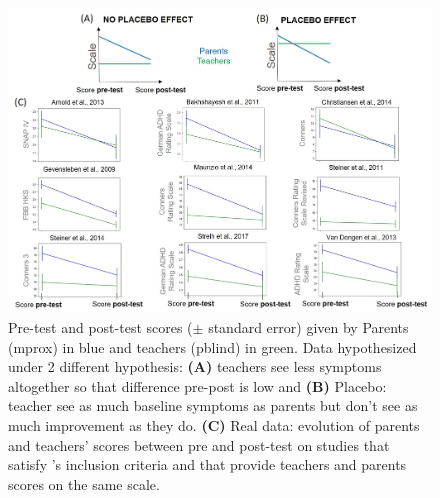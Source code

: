 \begin{figure}[h!]
  \centering
  \includegraphics[width=1.0\linewidth]{figures/discussion_on_placebo_effect_colors_2-columns_fitting_image.jpg}
  \caption{Pre-test and post-test scores ($\pm$ standard error) given by Parents (\gls{mprox}) in blue and teachers (\gls{pblind}) in green. 
	Data hypothesized under 2 different hypothesis: \textbf{(A)} teachers see less symptoms altogether so that difference pre-post is low and \textbf{(B)}
	Placebo: teacher see as much baseline symptoms as parents but don't see as much improvement as they do. \textbf{(C)} Real data: evolution of parents 
	and teachers' scores between pre and post-test on studies that satisfy \citeauthor{Cortese2016}'s inclusion criteria and that provide teachers and parents
	scores on the same scale.}
  \label{Figure:discussion_on_placebo_effect_colors_2-columns_fitting_image}
\end{figure} 
